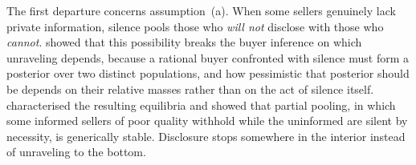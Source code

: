 The first departure concerns assumption~(a). When some sellers genuinely lack private
information, silence pools those who \emph{will not} disclose with those who \emph{cannot}.
\citet{dye_disclosure_1985} showed that this possibility breaks the buyer inference on which
unraveling depends, because a rational buyer confronted with silence must form a posterior over two
distinct populations, and how pessimistic that posterior should be depends on their relative
masses rather than on the act of silence itself. \citet{jung_kwon_1988} characterised the
resulting equilibria and showed that partial pooling, in which some informed sellers of poor
quality withhold while the uninformed are silent by necessity, is generically stable. Disclosure
stops somewhere in the interior instead of unraveling to the bottom.
